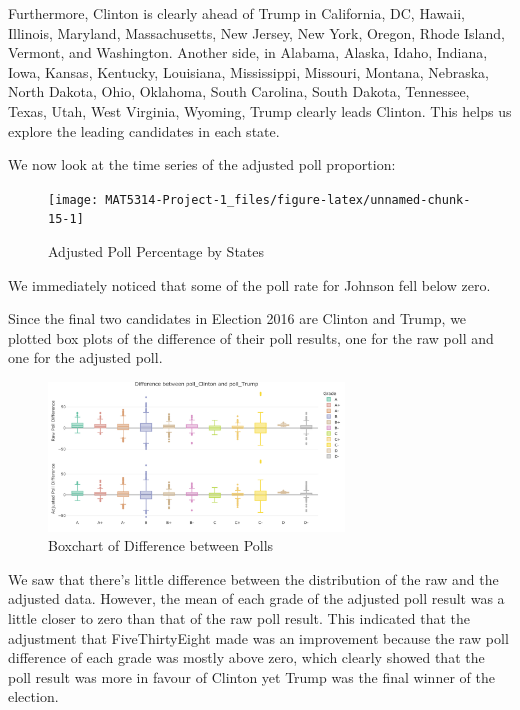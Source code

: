 \documentclass[
  12pt,
]{article}
\begin{document}
Furthermore, Clinton is clearly ahead of Trump in California, DC,
Hawaii, Illinois, Maryland, Massachusetts, New Jersey, New York, Oregon,
Rhode Island, Vermont, and Washington. Another side, in Alabama, Alaska,
Idaho, Indiana, Iowa, Kansas, Kentucky, Louisiana, Mississippi,
Missouri, Montana, Nebraska, North Dakota, Ohio, Oklahoma, South
Carolina, South Dakota, Tennessee, Texas, Utah, West Virginia, Wyoming,
Trump clearly leads Clinton. This helps us explore the leading
candidates in each state.

We now look at the time series of the adjusted poll proportion:

\begin{minipage}[t]{0.7\textwidth}
\begin{figure}
\texttt{[image: MAT5314-Project-1\_files/figure-latex/unnamed-chunk-15-1]} \caption{Adjusted Poll Percentage by States}\label{fig:unnamed-chunk-15}
\end{figure}
\end{minipage}
\begin{minipage}[t]{0.3\textwidth}
\vspace{0pt}
We immediately noticed that some of the poll rate for Johnson fell below zero. 
\end{minipage}

Since the final two candidates in Election 2016 are Clinton and Trump,
we plotted box plots of the difference of their poll results, one for
the raw poll and one for the adjusted poll.

\begin{figure}
\centering
\includegraphics[width=0.7\textwidth,height=\textheight]{./Figures/boxchart.png}
\caption{Boxchart of Difference between Polls}
\end{figure}

We saw that there's little difference between the distribution of the
raw and the adjusted data. However, the mean of each grade of the
adjusted poll result was a little closer to zero than that of the raw
poll result. This indicated that the adjustment that FiveThirtyEight
made was an improvement because the raw poll difference of each grade
was mostly above zero, which clearly showed that the poll result was
more in favour of Clinton yet Trump was the final winner of the
election.
\end{document}
